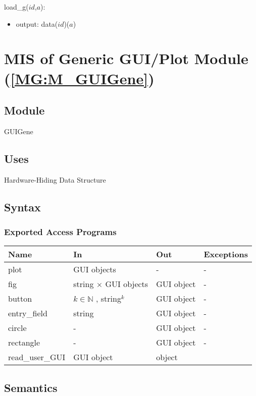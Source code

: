 \documentclass[12pt, titlepage]{article}
\begin{document}
\noindent load{\_}g($id$,$a$):
\begin{itemize}
\item output: data($id$)($a$)
\end{itemize}

\section{MIS of Generic GUI/Plot Module (\texorpdfstring{\cref{MG:M_GUIGene}}))} \label{MIS_GUIGene}

\subsection{Module}
GUIGene
\subsection{Uses}
Hardware-Hiding
Data Structure
\subsection{Syntax}

\subsubsection{Exported Access Programs}

\begin{center}
\begin{tabular}{p{3cm} p{4cm} p{4cm} p{2cm}}
\hline
\textbf{Name} & \textbf{In} & \textbf{Out} & \textbf{Exceptions} \\
\hline
plot & GUI objects & - & - \\
fig & string $\times$ GUI objects &  GUI object & - \\
button & $k \in \mathbb{N}$ , {string}$^{k}$ &  GUI object & - \\
entry{\_}field & string &  GUI object & - \\
circle & - &  GUI object & - \\
rectangle & - & GUI object & - \\
read{\_}user{\_}GUI & GUI object & object \\
\hline
\end{tabular}
\end{center}

\subsection{Semantics}
\end{document}
